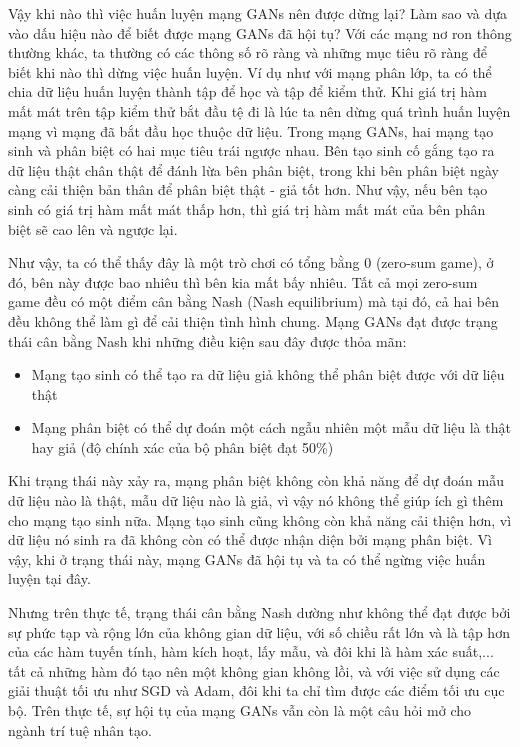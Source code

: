 Vậy khi nào thì việc huấn luyện mạng GANs nên được dừng lại? Làm sao và dựa vào dấu hiệu nào để biết được mạng GANs đã hội tụ? Với các mạng nơ ron thông thường khác, ta thường có các thông số rõ ràng và những mục tiêu rõ ràng để biết khi nào thì dừng việc huấn luyện. Ví dụ như với mạng phân lớp, ta có thể chia dữ liệu huấn luyện thành tập để học và tập để kiểm thử. Khi giá trị hàm mất mát trên tập kiểm thử bắt đầu tệ đi là lúc ta nên dừng quá trình huấn luyện mạng vì mạng đã bắt đầu học thuộc dữ liệu. Trong mạng GANs, hai mạng tạo sinh và phân biệt có hai mục tiêu trái ngược nhau. Bên tạo sinh cố gắng tạo ra dữ liệu thật chân thật để đánh lừa bên phân biệt, trong khi bên phân biệt ngày càng cải thiện bản thân để phân biệt thật - giả tốt hơn. Như vậy, nếu bên tạo sinh có giá trị hàm mất mát thấp hơn, thì giá trị hàm mất mát của bên phân biệt sẽ cao lên và ngược lại.

Như vậy, ta có thể thấy đây là một trò chơi có tổng bằng 0 (zero-sum game), ở đó, bên này được bao nhiêu thì bên kia mất bấy nhiêu. Tất cả mọi zero-sum game đều có một điểm cân bằng Nash (Nash equilibrium) mà tại đó, cả hai bên đều không thể làm gì để cải thiện tình hình chung. Mạng GANs đạt được trạng thái cân bằng Nash khi những điều kiện sau đây được thỏa mãn:
\begin{itemize}
    \item Mạng tạo sinh có thể tạo ra dữ liệu giả không thể phân biệt được với dữ liệu thật
    \item Mạng phân biệt có thể dự đoán một cách ngẫu nhiên một mẫu dữ liệu là thật hay giả (độ chính xác của bộ phân biệt đạt 50\%)
\end{itemize}
Khi trạng thái này xảy ra, mạng phân biệt không còn khả năng để dự đoán mẫu dữ liệu nào là thật, mẫu dữ liệu nào là giả, vì vậy nó không thể giúp ích gì thêm cho mạng tạo sinh nữa. Mạng tạo sinh cũng không còn khả năng cải thiện hơn, vì dữ liệu nó sinh ra đã không còn có thể được nhận diện bởi mạng phân biệt. Vì vậy, khi ở trạng thái này, mạng GANs đã hội tụ và ta có thể ngừng việc huấn luyện tại đây.

Nhưng trên thực tế, trạng thái cân bằng Nash dường như không thể đạt được bởi sự phức tạp và rộng lớn của không gian dữ liệu, với số chiều rất lớn và là tập hơn của các hàm tuyến tính, hàm kích hoạt, lấy mẫu, và đôi khi là hàm xác suất,... tất cả những hàm đó tạo nên một không gian không lồi, và với việc sử dụng các giải thuật tối ưu như SGD và Adam, đôi khi ta chỉ tìm được các điểm tối ưu cục bộ. Trên thực tế, sự hội tụ của mạng GANs vẫn còn là một câu hỏi mở cho ngành trí tuệ nhân tạo.

